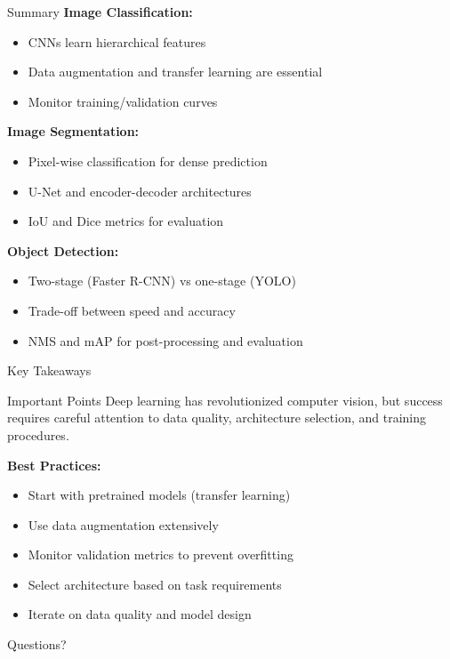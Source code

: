 \documentclass[aspectratio=169,10pt]{beamer}
\begin{document}
\begin{frame}{Summary}
\textbf{Image Classification:}
\begin{itemize}
\item CNNs learn hierarchical features
\item Data augmentation and transfer learning are essential
\item Monitor training/validation curves
\end{itemize}

\textbf{Image Segmentation:}
\begin{itemize}
\item Pixel-wise classification for dense prediction
\item U-Net and encoder-decoder architectures
\item IoU and Dice metrics for evaluation
\end{itemize}

\textbf{Object Detection:}
\begin{itemize}
\item Two-stage (Faster R-CNN) vs one-stage (YOLO)
\item Trade-off between speed and accuracy
\item NMS and mAP for post-processing and evaluation
\end{itemize}
\end{frame}

\begin{frame}{Key Takeaways}
\begin{alertblock}{Important Points}
Deep learning has revolutionized computer vision, but success requires careful attention to data quality, architecture selection, and training procedures.
\end{alertblock}

\textbf{Best Practices:}
\begin{itemize}
\item Start with pretrained models (transfer learning)
\item Use data augmentation extensively
\item Monitor validation metrics to prevent overfitting
\item Select architecture based on task requirements
\item Iterate on data quality and model design
\end{itemize}
\end{frame}

\begin{frame}[standout]
Questions?
\end{frame}
\end{document}
